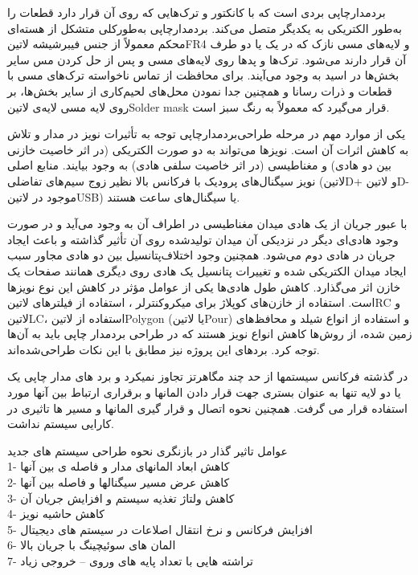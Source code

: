 بردمدارچاپی بردی است که با کانکتور و ترک‌هایی که روی آن قرار دارد قطعات را به‌طور الکتریکی به یکدیگر متصل می‌کند. بردمدارچاپی به‌طورکلی متشکل از هسته‌ای محکم معمولاً از جنس فیبرشیشه ‌لاتین{FR4} و لایه‌های مسی نازک که در یک یا دو طرف آن قرار دارند می‌شود. ترک‌ها و پدها روی لایه‌های مسی و پس از حل کردن مس سایر بخش‌ها در اسید به وجود می‌آیند. برای محافظت از تماس ناخواسته ترک‌های مسی با قطعات و ذرات رسانا و همچنین جدا نمودن محل‌های لحیم‌کاری از سایر بخش‌ها، بر روی لایه مسی لایه‌ی ‌لاتین{Solder mask} قرار می‌گیرد که معمولاً به رنگ سبز است.

یکی از موارد مهم در مرحله طراحی‌بردمدارچاپی توجه به تأثیرات نویز در مدار و تلاش به کاهش اثرات آن است. نویزها می‌تواند به دو صورت الکتریکی (در اثر خاصیت خازنی بین دو هادی) و مغناطیسی (در اثر خاصیت سلفی هادی) به وجود بیایند. منابع اصلی نویز سیگنال‌های پرودیک با فرکانس بالا نظیر زوج سیم‌های تفاضلی (‌لاتین{D+} و ‌لاتین{D-} موجود در ‌لاتین{USB}) یا سیگنال‌های ساعت هستند. 

با عبور جریان از یک هادی میدان مغناطیسی در اطراف آن به وجود می‌آید و در صورت وجود هادی‌ای دیگر در نزدیکی آن میدان تولیدشده روی آن تأثیر گذاشته و باعث ایجاد جریان در هادی دوم می‌شود. همچنین وجود اختلاف‌پتانسیل بین دو هادی مجاور سبب ایجاد میدان الکتریکی شده و تغییرات پتانسیل یک هادی روی دیگری همانند صفحات یک خازن اثر می‌گذارد. کاهش طول هادی‌ها یکی از عوامل مؤثر در کاهش این نوع نویزها است. استفاده از خازن‌های کوپلاژ برای میکروکنترلر ، استفاده از فیلترهای ‌لاتین{RC} و ‌لاتین{LC}، استفاده از ‌لاتین{Polygon} (یا ‌لاتین{Pour}) و استفاده از انواع شیلد و محافظ‌های زمین شده، از روش‌ها کاهش انواع نویز هستند که در طراحی بردمدار چاپی باید به آن‌ها توجه کرد. بردهای این پروژه نیز مطابق با این نکات طراحی‌شده‌اند.



در گذشته فرکانس سیستمها از حد چند مگاهرتز تجاوز نمیکرد و برد های مدار چاپی یک یا دو لایه تنها به عنوان بستری جهت قرار دادن المانها و برقراری ارتباط بین آنها مورد استفاده قرار می گرفت. همچنین نحوه اتصال و قرار گیری المانها و مسیر ها تاثیری در کارایی سیستم نداشت.

عوامل تاثیر گذار در بازنگری نحوه طراحی سیستم های جدید\\ 
1- کاهش ابعاد المانهای مدار و فاصله ی بین آنها \\
2- کاهش عرض مسیر سیگنالها و فاصله بین آنها \\
3- کاهش ولتاژ تغذیه سیستم و افزایش جریان آن\\
4- کاهش حاشیه نویز\\
5- افزایش فرکانس و نرخ انتقال اصلاعات در سیستم های دیجیتال\\
6- المان های سوئیچینگ با جریان بالا\\
7- تراشته هایی با تعداد پایه های وروی – خروجی زیاد

